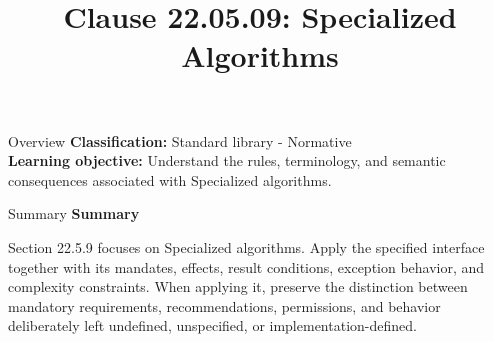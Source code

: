 \documentclass[10pt,letterpaper]{article}
\title{Clause 22.05.09: Specialized Algorithms}
\author{}
\date{}
\begin{document}
\maketitle
\begin{CornellOverviewBox}{Overview}
\textbf{Classification:} Standard library - Normative\\[2pt]
\textbf{Learning objective:} Understand the rules, terminology, and semantic consequences associated with Specialized algorithms.
\end{CornellOverviewBox}\begin{CornellSummaryBox}{Summary}
{\sffamily\bfseries\color{Accent} Summary}\par\vspace{3pt}Section 22.5.9 focuses on Specialized algorithms. Apply the specified interface together with its mandates, effects, result conditions, exception behavior, and complexity constraints. When applying it, preserve the distinction between mandatory requirements, recommendations, permissions, and behavior deliberately left undefined, unspecified, or implementation-defined.
\end{CornellSummaryBox}
\end{document}
